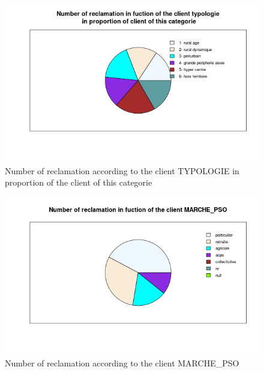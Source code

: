 \documentclass[a4paper, 11pt]{article}
\begin{document}
        \begin{figure}[!ht]
        	\centering
                \includegraphics[height = 10 cm]{Valentin/Number_of_reclamation_in_fuction_of_the_client_typologie_in_proportion.png}
                \caption{Number of reclamation according to the client TYPOLOGIE in proportion of the client of this categorie}
                \label{fig:reclamtion_typo2}
        \end{figure}
        
        \begin{figure}[!ht]
        	\centering
                \includegraphics[height = 10 cm]{Valentin/Number_of_reclamation_in_fuction_of_the_client_MARCHE_PSO.png}
                \caption{Number of reclamation according to the client MARCHE\_PSO}
                \label{fig:reclamtion_pso1}
        \end{figure}
        
\end{document}
